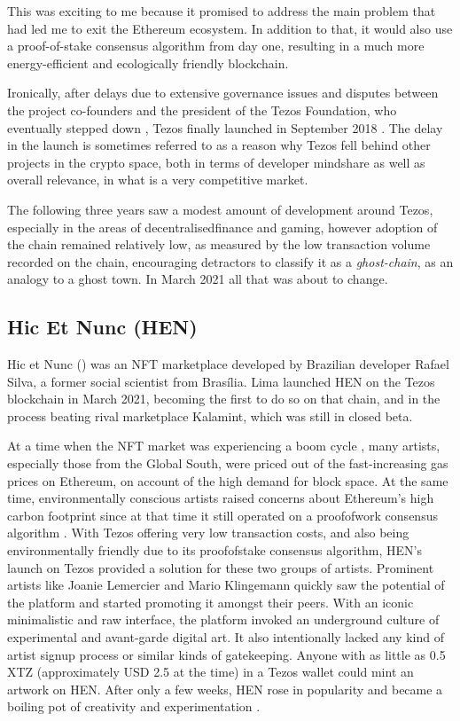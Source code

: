 This was exciting to me because it promised to address the main problem that had led me to exit the Ethereum ecosystem. In addition to that, it would also use a proof-of-stake consensus algorithm from day one, resulting in a much more energy-efficient and ecologically friendly blockchain.


Ironically, after delays due to extensive governance issues and disputes between the project co-founders and the president of the Tezos Foundation, who eventually stepped down \cite{irreraExclusiveTezosFounders2017}, Tezos finally launched in September 2018 \cite{daleBillionTezosBlockchain2018}. The delay in the launch is sometimes referred to as a reason why Tezos fell behind other projects in the crypto space, both in terms of developer mindshare as well as overall relevance, in what is a very competitive market.

The following three years saw a modest amount of development around Tezos, especially in the areas of \gls{decentralisedfinance} and gaming, however adoption of the chain remained relatively low, as measured by the low transaction volume recorded on the chain, encouraging detractors to classify it as a \emph{\gls{ghost-chain}}, as an analogy to a ghost town. In March 2021 all that was about to change.


\subsection*{Hic Et Nunc (HEN)}


Hic et Nunc () was an NFT marketplace developed by Brazilian developer Rafael Silva, a former social scientist from Brasília. Lima launched HEN on the Tezos blockchain in March 2021, becoming the first to do so on that chain, and in the process beating rival marketplace Kalamint, which was still in closed beta.

At a time when the NFT market was experiencing a boom cycle \cite{haywardBiggestCryptoStory2021}, many artists, especially those from the Global South, were priced out of the fast-increasing gas prices on Ethereum, on account of the high demand for block space. At the same time, environmentally conscious artists raised concerns about Ethereum's high carbon footprint since at that time it still operated on a \gls{proofofwork} consensus algorithm \cite{lemercierProblemEthereumCryptoArt2021}. With Tezos offering very low transaction costs, and also being environmentally friendly due to its \gls{proofofstake} consensus algorithm, HEN's launch on Tezos provided a solution for these two groups of artists. Prominent artists like Joanie Lemercier and Mario Klingemann quickly saw the potential of the platform and started promoting it amongst their peers. With an iconic minimalistic and raw interface, the platform invoked an underground culture of experimental and avant-garde digital art. It also intentionally lacked any kind of artist signup process or similar kinds of gatekeeping. Anyone with as little as 0.5 XTZ (approximately USD 2.5 at the time) in a Tezos wallet could mint an artwork on HEN. After only a few weeks, HEN rose in popularity and became a boiling pot of creativity and experimentation \cite{evansBrazilDIYEcofriendly2021}.


